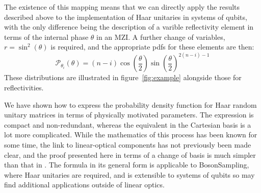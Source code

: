 \documentclass[aps,prl,twocolumn,floatfix]{revtex4}
\newcommand{\of}[1]{\!\left(#1\right)}
\newcommand{\pdf}{{pdf}}
\newcommand{\prob}[1]{\mathcal{#1}}
\newcommand{\bosonsampling}{\textsc BosonSampling}
\begin{document}
The existence of this mapping means that we can directly apply the results
described above to the implementation of Haar unitaries in systems of qubits,
with the only difference being the description of a varible reflectivity element
in terms of the internal phase \(\theta\) in an MZI. A further change of
variables, \(r = \sin^{2} \of{\theta} \) is required, and the appropriate
\pdf{}s for these elements are then:
\begin{equation}
  \prob{P}_{\theta_{i}} \of{ \theta } = \left( n-i \right) \cos \of{
  \frac{\theta}{2} } \sin \of{ \frac{\theta}{2} }^{2 \left(n-i\right) -1}
\end{equation}
These distributions are illustrated in figure~\ref{fig:example} alongside those
for reflectivities.

We have shown how to express the probability density function for Haar random
unitary matrices in terms of physically motivated parameters. The expression is
compact and non-redundant, whereas the equivalent in the Cartesian basis is a
lot more complicated. While the mathematics of this process has been known
for some time, the link to linear-optical components has not previously been
made clear, and the proof presented here in terms of a change of basis is much
simpler than that in \cite{sp-jpa-43-385306}. The formula in its general form
is applicable to \bosonsampling{}, where Haar unitaries are required, and is
extensible to systems of qubits so may find additional applications outside of
linear optics.
\end{document}
